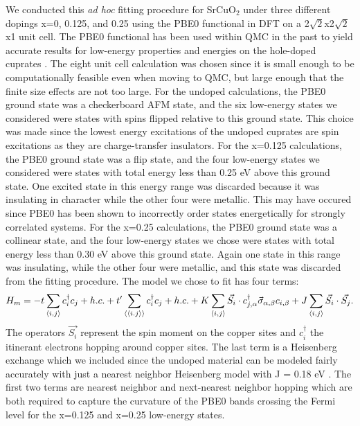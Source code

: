 \documentclass{article}
\begin{document}
We conducted this \textit{ad hoc} fitting procedure for SrCuO$_2$ under three different dopings x=0, 0.125, and 0.25 using the PBE0 functional in DFT on a 2$\sqrt{2}$x2$\sqrt{2}$x1 unit cell. 
The PBE0 functional has been used within QMC in the past to yield accurate results for low-energy properties and energies on the hole-doped cuprates \cite{Wagner2015,Narayan2017,Wagner2014}. 
The eight unit cell calculation was chosen since it is small enough to be computationally feasible even when moving to QMC, but large enough that the finite size effects are not too large. 
For the undoped calculations, the PBE0 ground state was a checkerboard AFM state, and the six low-energy states we considered were states with spins flipped relative to this ground state. 
This choice was made since the lowest energy excitations of the undoped cuprates are spin excitations as they are charge-transfer insulators. 
For the x=0.125 calculations, the PBE0 ground state was a flip state, and the four low-energy states we considered were states with total energy less than 0.25 eV above this ground state. 
One excited state in this energy range was discarded because it was insulating in character while the other four were metallic. 
This may have occured since PBE0 has been shown to incorrectly order states energetically for strongly correlated systems.
For the x=0.25 calculations, the PBE0 ground state was a collinear state, and the four low-energy states we chose were states with total energy less than 0.30 eV above this ground state. 
Again one state in this range was insulating, while the other four were metallic, and this state was discarded from the fitting procedure. 
The model we chose to fit has four terms: 
\begin{equation}
H_m = -t \sum_{\langle i,j \rangle} c_i^\dagger c_j + h.c.
+ t^\prime\sum_{\langle \langle i.j \rangle \rangle} c_i^\dagger c_j + h.c. +\\
K\sum_{\langle i,j \rangle} \vec{S_i} \cdot c_{j,\alpha}^\dagger \vec{\sigma}_{\alpha,\beta} c_{i,\beta} + J \sum_{\langle i,j \rangle} \vec{S_i} \cdot \vec{S_j}.
\end{equation}
The operators $\vec{S_i}$ represent the spin moment on the copper sites and $c_i^\dagger$ the itinerant electrons hopping around copper sites. 
The last term is a Heisenberg exchange which we included since the undoped material can be modeled fairly accurately with just a nearest neighbor Heisenberg model with J = 0.18 eV \cite{Wagner2014}. 
The first two terms are nearest neighbor and next-nearest neighbor hopping which are both required to capture the curvature of the PBE0 bands crossing the Fermi level for the x=0.125 and x=0.25 low-energy states. 
\end{document}
